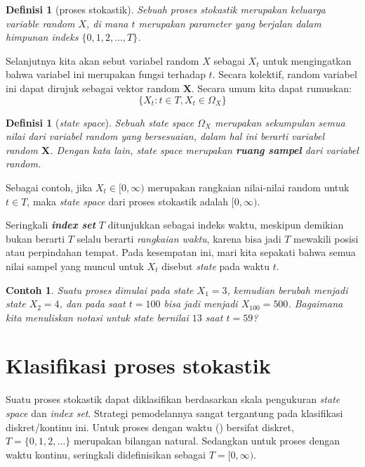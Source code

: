 \documentclass[11pt,b5paper,twoside]{book}
\newcommand{\bX}{\boldsymbol{X}}
\newcommand{\sspace}{\textit{state space }}
\newtheorem{definition}[theorem]{Definisi}
\newtheorem{ex}[theorem]{Contoh}
\begin{document}
	
	\begin{definition}[proses stokastik]
	\label{prosto}
	Sebuah proses stokastik merupakan keluarga variable random $X$, di mana $t$ merupakan parameter yang berjalan dalam himpunan indeks $\{0,1,2,..., T\}$.  
	\end{definition}

	\noindent Selanjutnya kita akan sebut variabel random $X$ sebagai $X_t$ untuk mengingatkan bahwa variabel ini merupakan fungsi terhadap $t$. Secara kolektif, random variabel ini dapat dirujuk sebagai vektor random $\bX$. Secara umum kita dapat rumuskan:
	\[ \{X_t : t \in T, X_t \in \Omega_X\}\]

	\begin{definition}[\textit{state space}]
		\label{space}
		Sebuah \sspace  $\Omega_X$ merupakan sekumpulan semua nilai dari variabel random yang bersesuaian, dalam hal ini berarti variabel random $\bX$. Dengan kata lain, \sspace  merupakan \textbf{ruang sampel} dari variabel random.  
	\end{definition}

	\noindent Sebagai contoh, jika $X_t \in [0, \infty)$ merupakan rangkaian nilai-nilai random untuk $t \in T$, maka \sspace  dari proses stokastik adalah $[0, \infty)$.

	\noindent Seringkali \textbf{\textit{index set}} $T$ ditunjukkan sebagai indeks waktu, meskipun demikian bukan berarti $T$ selalu berarti \textit{rangkaian waktu}, karena bisa jadi $T$ mewakili posisi atau perpindahan tempat. Pada kesempatan ini, mari kita sepakati bahwa semua nilai sampel yang muncul untuk $X_t$ disebut \textit{state} pada waktu $t$.

	\begin{ex}
		Suatu proses dimulai pada \textit{state} $X_1 = 3$, kemudian berubah menjadi \textit{state} $X_2 = 4$, dan pada saat $t=100$ bisa jadi menjadi $X_{100} = 500$. Bagaimana kita menuliskan notasi untuk \textit{state} bernilai $13$ saat $t = 59$?
	\end{ex}
	
	
	\section{Klasifikasi proses stokastik} %
	\noindent Suatu proses stokastik dapat diklasifikan berdasarkan skala pengukuran \sspace dan \textit{index set}. Strategi pemodelannya sangat tergantung pada klasifikasi diskret/kontinu ini. Untuk proses dengan waktu () bersifat diskret, $T = \{0,1,2, \dots\}$ merupakan bilangan natural. Sedangkan untuk proses dengan waktu kontinu,  seringkali didefinisikan sebagai $T=[0,\infty)$.
	
\end{document}
